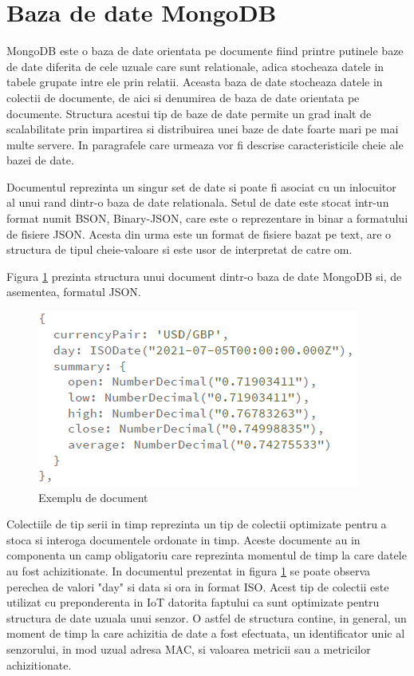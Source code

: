 \section{Baza de date MongoDB}\label{sec:mongodb}
MongoDB este o baza de date orientata pe documente fiind printre putinele baze de date diferita de cele uzuale care sunt relationale, adica stocheaza datele in tabele 
grupate intre ele prin relatii. Aceasta baza de date stocheaza datele in colectii de documente, de aici si denumirea de baza de date orientata pe documente. 
Structura acestui tip de baze de date permite un grad inalt de scalabilitate prin impartirea si distribuirea unei baze de date foarte mari pe mai multe 
servere. In paragrafele care urmeaza vor fi descrise caracteristicile cheie ale bazei de date.

Documentul reprezinta un singur set de date si poate fi asociat cu un inlocuitor al unui rand dintr-o baza de date relationala. Setul de date este stocat intr-un 
format numit BSON, Binary-JSON, care este o reprezentare in binar a formatului de fisiere JSON. Acesta din urma este un format de fisiere bazat pe text,
are o structura de tipul cheie-valoare si este usor de interpretat de catre om.

Figura \ref{fig:MongoDBDocument} prezinta structura unui document dintr-o baza de date MongoDB si, de asementea, formatul JSON.
\begin{figure}[H]
    \centering
    \includegraphics[scale=0.8]{figs/mongoDBDocument.png}
    \caption{Exemplu de document \cite{mongoDB}}
    \label{fig:MongoDBDocument}
\end{figure}

Colectiile de tip serii in timp reprezinta un tip de colectii optimizate pentru a stoca si interoga documentele ordonate in timp. Aceste documente au in 
componenta un camp obligatoriu care reprezinta momentul de timp la care datele au fost achizitionate. In documentul prezentat in figura \ref{fig:MongoDBDocument} 
se poate observa perechea de valori "day" si data si ora in format ISO. Acest tip de colectii este utilizat cu preponderenta in IoT datorita faptului ca sunt 
optimizate pentru structura de date uzuala unui senzor. O astfel de structura contine, in general, un moment de timp la care achizitia de date a fost efectuata, 
un identificator unic al senzorului, in mod uzual adresa MAC, si valoarea metricii sau a metricilor achizitionate.

